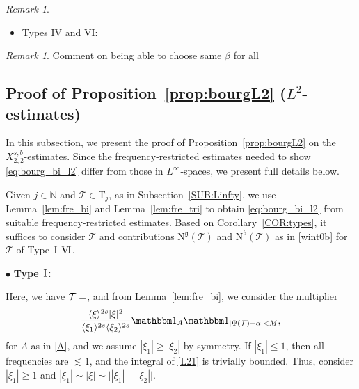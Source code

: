 \documentclass[%
11pt,  reqno]{amsart}
\makeatletter
\newcommand{\I}{\hspace{0.2mm}\textup{I}\hspace{0.2mm}}
\newcommand{\5}{\textup{V}}
\newcommand{\VI}{\text{V\hspace{-1.6mm} I}}
\newcommand{\noi}{\noindent}
\newcommand{\ind}{\mathbbm 1}
\newcommand{\les}{\lesssim}
\theoremstyle{remark}
\newtheorem{remark}[theorem]{Remark}
\newcommand{\bul}{\bullet}
\newcommand{\TT}{\mathcal{T}}
\newcommand{\Tr}{\mathrm{T}}
\newcommand{\al}{\alpha}
\newcommand{\be}{\beta}
\newcommand{\bfrak}{\mathfrak{b}}
\newcommand{\gfrak}{\mathfrak{g}}
\newcommand{\jb}[1]
{\langle #1 \rangle}
\newcommand{\N}{\mathbb{N}}
\def\<#1>{\csname MH@symb@#1\endcsname}
\numberwithin{equation}{section}
\numberwithin{theorem}{section}
\newcommand{\NN}{\mathrm{N}}
\makeatother
\begin{document}
\begin{remark}
\begin{itemize}
In Case 3, we need to do the analogous change of variables based on Morse's Lemma (see \cite[pp.23-24]{CLS24}):
\begin{align}
\cdots &\les \jb{\xi}^{-3s-\al + (s\lor 0) +1} \int \ind_{| | \xi|\xi|^\al ( c + q_{11}^2 + q_2^2) - \be | \le M}  |\xi|^2  dq_{11} dq_2
\\
&
\les \jb{\xi}^{-3s - \al + 3 + (s\lor 0) - (1+\al)} M \les M , 
\end{align}
for $-3s -2\al + 2 < 0 \iff s > \frac23(1-\al) $. 

\item Types IV and VI:




\end{itemize}





\end{remark}

\begin{remark}
    \rm 
    Comment on being able to choose same $\be$ for all
\end{remark}

\subsection{Proof of Proposition~\ref{prop:bourgL2} ($L^2$-estimates)}
\label{SUB:L2}


In this subsection, we present the proof of Proposition~\ref{prop:bourgL2}
on the $X^{s, b}_{2,2}$-estimates. 
Since the frequency-restricted estimates needed to show \eqref{eq:bourg_bi_l2} differ from those in $L^\infty$-spaces, we present full details below. 


Given $j\in \N$ and $\TT\in \Tr_j$, as in Subsection~\ref{SUB:Linfty}, 
we use Lemma~\ref{lem:fre_bi} and Lemma~\ref{lem:fre_tri} to obtain \eqref{eq:bourg_bi_l2}  from suitable frequency-restricted  estimates. Based on Corollary~\ref{COR:types}, it suffices to consider $\TT$ and contributions $\NN^\gfrak(\TT)$ and $\NN^\bfrak(\TT)$ as in \eqref{wint0b} for $\TT$ of Type $\I$-$\VI$. 


\smallskip

\noi
$\bul$ \textbf{Type $\I$:}

Here, we have $\TT = \<1>$, and
from Lemma~\ref{lem:fre_bi}, we consider the multiplier
\begin{align}
\label{L21}
       \frac{\jb{\xi}^{2s} |\xi|^2 }{\jb{\xi_1}^{2s}\jb{\xi_2}^{2s}} 
    \ind_A \ind_{|\Psi(\TT) - \al| < M } , 
\end{align}
 for $A$ as in \eqref{A}, and we assume $|\xi_1| \ge |\xi_2|$ by symmetry. 
If $|\xi_1| \le 1$, then all frequencies are $\les 1$, and the integral of \eqref{L21} is trivially bounded. Thus, consider $|\xi_1| \ge 1$ and $|\xi_1| \sim |\xi| \sim \big| |\xi_1| - |\xi_2| \big|$.
\end{document}
